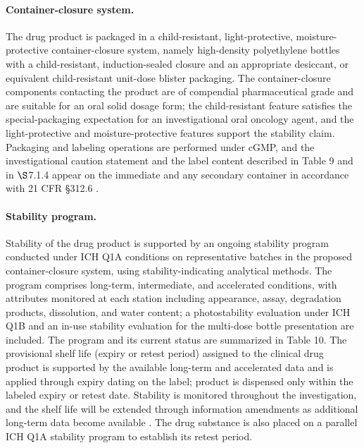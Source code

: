 \paragraph{Container-closure system.}
The drug product is packaged in a child-resistant, light-protective,
moisture-protective container-closure system, namely high-density polyethylene
bottles with a child-resistant, induction-sealed closure and an appropriate
desiccant, or equivalent child-resistant unit-dose blister packaging. The
container-closure components contacting the product are of compendial
pharmaceutical grade and are suitable for an oral solid dosage form; the
child-resistant feature satisfies the special-packaging expectation for an
investigational oral oncology agent, and the light-protective and
moisture-protective features support the stability claim. Packaging and labeling
operations are performed under cGMP, and the investigational caution statement and
the label content described in Table 9 and in $\S$7.1.4 appear on the immediate
and any secondary container in accordance with 21 CFR \S 312.6 \cite{phase1guidance}.

\paragraph{Stability program.}
Stability of the drug product is supported by an ongoing stability program
conducted under ICH Q1A conditions on representative batches in the proposed
container-closure system, using stability-indicating analytical methods. The
program comprises long-term, intermediate, and accelerated conditions, with
attributes monitored at each station including appearance, assay, degradation
products, dissolution, and water content; a photostability evaluation under ICH
Q1B and an in-use stability evaluation for the multi-dose bottle presentation are
included. The program and its current status are summarized in Table 10. The
provisional shelf life (expiry or retest period) assigned to the clinical drug
product is supported by the available long-term and accelerated data and is
applied through expiry dating on the label; product is dispensed only within the
labeled expiry or retest date. Stability is monitored throughout the
investigation, and the shelf life will be extended through information amendments
as additional long-term data become available \cite{phase1guidance}. The drug
substance is also placed on a parallel ICH Q1A stability program to establish its
retest period.

